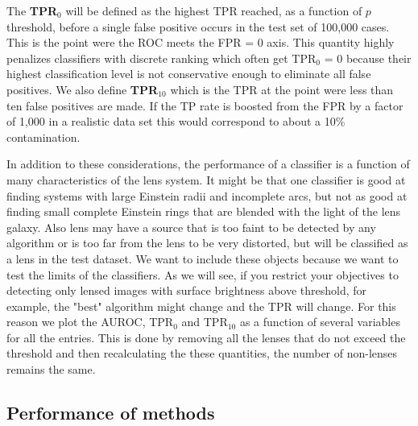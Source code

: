 \documentclass[useAMS,usenatbib]{mnras}
\begin{document}
The {\bf TPR$_0$} will be defined as the highest TPR reached, as a function of $p$ threshold, before a single false positive occurs in the test set of 100,000 cases.  This is the point were the ROC meets the FPR = 0 axis.  This quantity highly penalizes classifiers with discrete ranking which often get TPR$_0$ = 0 because their highest classification level is not conservative enough to eliminate all false positives.  We also define {\bf TPR$_{10}$} which is the TPR at the point were less than ten false positives are made.  If the TP rate is boosted from the FPR by a factor of 1,000 in a realistic data set this would correspond to about a 10\% contamination.

In addition to these considerations, the performance of a classifier is a function of many characteristics of the lens system.  It might be that one classifier is good at finding systems with large Einstein radii and incomplete arcs, but not as good at finding small complete Einstein rings that are blended with the light of the lens galaxy.  Also lens may have a source that is too faint to be detected by any algorithm or is too far from the lens to be very distorted, but will be classified as a lens in the test dataset.   We want to include these objects because we want to test the limits of the classifiers.  As we will see, if you restrict your objectives to detecting only lensed images with surface brightness above threshold, for example, the "best" algorithm might change and the TPR will change.  For this reason we plot the AUROC, TPR$_0$ and TPR$_{10}$ as a function of several variables for all the entries.  This is done by removing all the lenses that do not exceed the threshold and then recalculating the these quantities, the number of non-lenses remains the same.

\subsection{Performance of methods}
\label{sec:performance}
\end{document}
